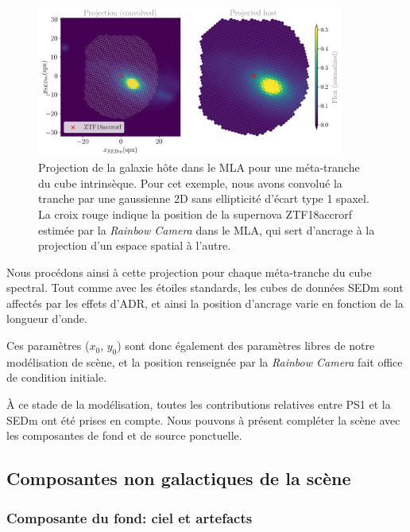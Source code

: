 \documentclass[../main/main.tex]{subfiles}
\begin{document}
\begin{figure}[ht]
  \centering
  \includegraphics[width=0.9\textwidth]{../figures/07_scene/projecthost.png}
  \caption[Projection de la galaxie hôte dans le MLA.]{Projection de la
    galaxie hôte dans le MLA pour une méta-tranche du cube
    intrinsèque. Pour cet exemple, nous avons convolué la tranche par une
    gaussienne 2D sans ellipticité d'écart type 1 spaxel. La croix rouge indique la position de la supernova
    ZTF18accrorf estimée par la \textit{Rainbow Camera} dans le MLA, qui
    sert d'ancrage à la projection d'un espace spatial à l'autre.}
  \label{fig:projecthost}
\end{figure}

Nous procédons ainsi à cette projection pour chaque méta-tranche du cube
spectral. Tout comme avec les étoiles standards, les 
cubes de données SEDm sont affectés par les effets d'ADR, et ainsi la position d'ancrage varie en fonction de la
longueur d'onde.

Ces paramètres ($x_{0}$, $y_{0}$) sont donc également des paramètres
libres de notre modélisation de scène, et la position renseignée par la
\textit{Rainbow Camera} fait office de condition initiale.

À ce stade de la modélisation, toutes les contributions relatives entre
PS1 et la SEDm ont été prises en compte.
Nous pouvons à présent compléter la scène avec les composantes de fond
et de source ponctuelle.

\subsection{Composantes non galactiques de la scène}

\subsubsection{Composante du fond: ciel et artefacts}
\end{document}
